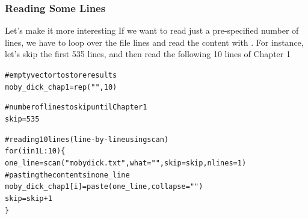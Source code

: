 \documentclass{beamer}\usepackage[]{graphicx}\usepackage[]{color}
\makeatletter
\newcommand{\hlnum}[1]{\textcolor[rgb]{0.063,0.58,0.627}{#1}}%
\newcommand{\hlstr}[1]{\textcolor[rgb]{0.063,0.58,0.627}{#1}}%
\newcommand{\hlcom}[1]{\textcolor[rgb]{0.588,0.588,0.588}{#1}}%
\newcommand{\hlopt}[1]{\textcolor[rgb]{0.196,0.196,0.196}{#1}}%
\newcommand{\hlstd}[1]{\textcolor[rgb]{0.196,0.196,0.196}{#1}}%
\newcommand{\hlkwa}[1]{\textcolor[rgb]{0.231,0.416,0.784}{#1}}%
\newcommand{\hlkwb}[1]{\textcolor[rgb]{0.627,0,0.314}{#1}}%
\newcommand{\hlkwc}[1]{\textcolor[rgb]{0,0.631,0.314}{#1}}%
\newcommand{\hlkwd}[1]{\textcolor[rgb]{0.78,0.227,0.412}{#1}}%
\newenvironment{kframe}{%
 \def\at@end@of@kframe{}%
 \ifinner\ifhmode%
  \def\at@end@of@kframe{\end{minipage}}%
  \begin{minipage}{\columnwidth}%
 \fi\fi%
 \def\FrameCommand##1{\hskip\@totalleftmargin \hskip-\fboxsep
 \colorbox{shadecolor}{##1}\hskip-\fboxsep
     \hskip-\linewidth \hskip-\@totalleftmargin \hskip\columnwidth}%
 \MakeFramed {\advance\hsize-\width
   \@totalleftmargin\z@ \linewidth\hsize
   \@setminipage}}%
 {\par\unskip\endMakeFramed%
 \at@end@of@kframe}
\newenvironment{knitrout}{}{} %
\makeatother
\begin{document}
\begin{frame}[fragile]
\frametitle{Reading Some Lines}

\begin{block}{Let's make it more interesting}
If we want to read just a pre-specified number of lines, we have to loop over the file lines and read the content with . For instance, let's skip the first 535 lines, and then read the following 10 lines of Chapter 1

\begin{knitrout}\tiny
{}\color{fgcolor}\begin{kframe}
\begin{alltt}
\hlcom{# empty vector to store results}
\hlstd{moby_dick_chap1} \hlkwb{=} \hlkwd{rep}\hlstd{(}\hlstr{""}\hlstd{,} \hlnum{10}\hlstd{)}

\hlcom{# number of lines to skip until Chapter 1}
\hlstd{skip} \hlkwb{=} \hlnum{535}

\hlcom{# reading 10 lines (line-by-line using scan)}
\hlkwa{for} \hlstd{(i} \hlkwa{in} \hlnum{1L}\hlopt{:}\hlnum{10}\hlstd{) \{}
  \hlstd{one_line} \hlkwb{=} \hlkwd{scan}\hlstd{(}\hlstr{"mobydick.txt"}\hlstd{,} \hlkwc{what} \hlstd{=} \hlstr{""}\hlstd{,} \hlkwc{skip} \hlstd{= skip,} \hlkwc{nlines} \hlstd{=} \hlnum{1}\hlstd{)}
  \hlcom{# pasting the contents in one_line}
  \hlstd{moby_dick_chap1[i]} \hlkwb{=} \hlkwd{paste}\hlstd{(one_line,} \hlkwc{collapse} \hlstd{=} \hlstr{" "}\hlstd{)}
  \hlstd{skip} \hlkwb{=} \hlstd{skip} \hlopt{+} \hlnum{1}
\hlstd{\}}
\end{alltt}
\end{kframe}
\end{knitrout}



{\scriptsize {}}
\end{block}

\end{frame}

\end{document}

